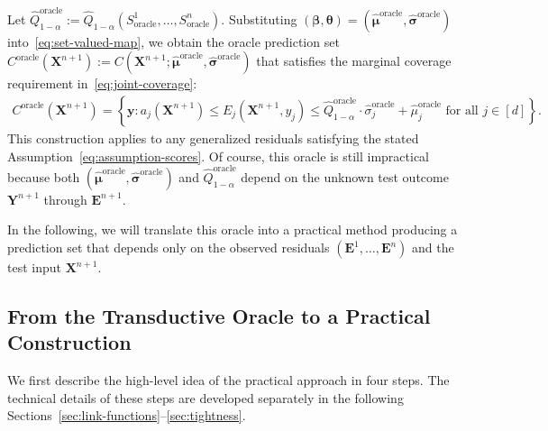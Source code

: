 Let $\hat Q^{\mathrm{oracle}}_{1-\alpha}:=\hat Q_{1-\alpha}(S^1_{\mathrm{oracle}},\ldots,S^n_{\mathrm{oracle}})$. Substituting $(\boldsymbol\beta,\boldsymbol\theta)=(\hat{\boldsymbol\mu}^{\mathrm{oracle}},\hat{\boldsymbol\sigma}^{\mathrm{oracle}})$ into~\eqref{eq:set-valued-map}, we obtain the oracle prediction set
$C^{\mathrm{oracle}}(\mathbf X^{n+1})
:=C(\mathbf X^{n+1};\hat{\boldsymbol\mu}^{\mathrm{oracle}},\hat{\boldsymbol\sigma}^{\mathrm{oracle}})$
that satisfies the marginal coverage requirement in~\eqref{eq:joint-coverage}:
\begin{align*}
C^{\mathrm{oracle}}(\mathbf X^{n+1})
=
\left\{
\mathbf y:
a_j(\mathbf X^{n+1})
\leq E_j(\mathbf X^{n+1},y_j)
\leq
\hat Q^{\mathrm{oracle}}_{1-\alpha}
\cdot\hat\sigma_j^{\mathrm{oracle}}
+\hat\mu_j^{\mathrm{oracle}}
\text{ for all }j\in[d]
\right\}.
\end{align*}
This construction applies to any generalized residuals satisfying the stated Assumption~\ref{eq:assumption-scores}. 
Of course, this oracle is still impractical because both $(\hat{\boldsymbol\mu}^{\mathrm{oracle}},\hat{\boldsymbol\sigma}^{\mathrm{oracle}})$ and $\hat Q^{\mathrm{oracle}}_{1-\alpha}$ depend on the unknown test outcome $\mathbf Y^{n+1}$ through $\mathbf E^{n+1}$.

In the following, we will translate this oracle into a practical method producing a prediction set that depends only on the observed residuals $(\mathbf E^1,\ldots,\mathbf E^n)$ and the test input $\mathbf X^{n+1}$.

\subsection{From the Transductive Oracle to a Practical Construction}\label{sec:blueprint}

We first describe the high-level idea of the practical approach in four steps. The technical details of these steps are developed separately in the following Sections~\ref{sec:link-functions}--\ref{sec:tightness}.


